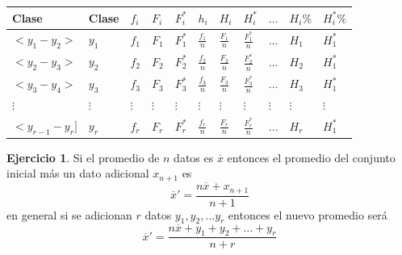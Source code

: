 \documentclass[
  10pt,
]{krantz}
\theoremstyle{definition}
\theoremstyle{definition}
\theoremstyle{definition}
\newtheorem{exercise}{Ejercicio}[chapter]
\theoremstyle{definition}
\theoremstyle{remark}
\begin{document}
\begin{longtable}[]{@{}
  >{\centering\arraybackslash}p{}
  >{\centering\arraybackslash}p{}
  >{\centering\arraybackslash}p{}
  >{\centering\arraybackslash}p{}
  >{\centering\arraybackslash}p{}
  >{\centering\arraybackslash}p{}
  >{\centering\arraybackslash}p{}
  >{\centering\arraybackslash}p{}
  >{\centering\arraybackslash}p{}
  >{\raggedright\arraybackslash}p{}
  >{\raggedright\arraybackslash}p{}@{}}
\toprule
Clase & Clase & \(f_i\) & \(F_i\) & \(F_i^*\) & \(h_i\) & \(H_i\) & \(H_i^*\) & \(\ldots\) & \(H_i\%\) & \(H_i^*\%\) \\
\midrule
\endhead
\(<y_1-y_2>\) & \(y_1\) & \(f_1\) & \(F_1\) & \(F_1^*\) & \(\frac{f_1}{n}\) & \(\frac{F_1}{n}\) & \(\frac{F_1^*}{n}\) & \(\ldots\) & \(H_1\) & \(H_1^*\) \\
\(<y_2-y_3>\) & \(y_2\) & \(f_2\) & \(F_2\) & \(F_2^*\) & \(\frac{f_2}{n}\) & \(\frac{F_2}{n}\) & \(\frac{F_2^*}{n}\) & \(\ldots\) & \(H_2\) & \(H_1^*\) \\
\(<y_3-y_4>\) & \(y_3\) & \(f_3\) & \(F_3\) & \(F_3^*\) & \(\frac{f_3}{n}\) & \(\frac{F_3}{n}\) & \(\frac{F_3^*}{n}\) & \(\ldots\) & \(H_3\) & \(H_1^*\) \\
\(\vdots\) & \(\vdots\) & \(\vdots\) & \(\vdots\) & \(\vdots\) & \(\vdots\) & \(\vdots\) & \(\vdots\) & \(\vdots\) & \(\vdots\) & \(\vdots\) \\
\(<y_{r-1}-y_r]\) & \(y_r\) & \(f_r\) & \(F_r\) & \(F_r^*\) & \(\frac{f_r}{n}\) & \(\frac{F_r}{n}\) & \(\frac{F_r^*}{n}\) & \(...\) & \(H_r\) & \(H_1^*\) \\
\bottomrule
\end{longtable}

\begin{exercise}
\protect\hypertarget{exr:unnamed-chunk-4}{}{\label{exr:unnamed-chunk-4} }Si el promedio de \(n\) datos es \(\overline{x}\) entonces el promedio del conjunto inicial más un dato adicional \(x_{n+1}\) es \[\overline{x}'=\frac{n\overline{x}+x_{n+1}}{n+1}\] en general si se adicionan \(r\) datos \(y_1, y_2, \ldots y_r\) entonces el nuevo promedio será \[\overline{x}'=\frac{n\overline{x}+y_{1}+y_2+\ldots+y_r}{n+r}\]
\end{exercise}
\end{document}
